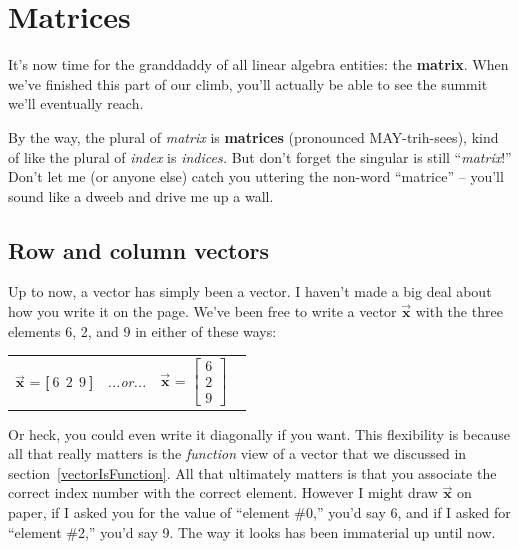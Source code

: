 

\chapter{Matrices}

It's now time for the granddaddy of all linear algebra entities: the
\textbf{matrix}. When we've finished this part of our climb, you'll actually be
able to see the summit we'll eventually reach.

By the way, the plural of \textit{matrix} is \textbf{matrices} (pronounced
MAY-trih-sees), kind of like the plural of \textit{index} is \textit{indices.}
But don't forget the singular is still ``\textit{matrix}!'' Don't let me (or
anyone else) catch you uttering the non-word ``matrice'' -- you'll sound like a
dweeb and drive me up a wall.

\section{Row and column vectors}

Up to now, a vector has simply been a vector. I haven't made a big deal about
how you write it on the page. We've been free to write a vector
$\overrightarrow{\textbf{x}}$ with the three elements 6, 2, and 9 in either of
these ways:

\vspace{-.15in}
\begin{center}
\begin{tabular}{ccc}
$\overrightarrow{\textbf{x}}$ = \textbf{[}$\ 6\ \ 2\ \ 9\ $\textbf{]} &
\quad\quad \textit{...or...} \quad\quad &
$\overrightarrow{\textbf{x}}$ = $\begin{bmatrix} 6 \\ 2 \\ 9 \end{bmatrix}$ \ 
\end{tabular}
\end{center}
\vspace{-.15in}


Or heck, you could even write it diagonally if you want. This flexibility is
because all that really matters is the \textit{function} view of a vector that
we discussed in section~\ref{vectorIsFunction}. All that ultimately matters is
that you associate the correct index number with the correct element. However I
might draw $\overrightarrow{\textbf{x}}$ on paper, if I asked you for the value
of ``element \#0,'' you'd say 6, and if I asked for ``element \#2,'' you'd say
9. The way it looks has been immaterial up until now.

